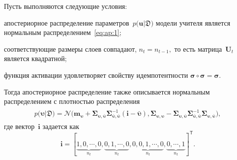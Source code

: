 \documentclass[12pt]{a&t}
\begin{document}
\begin{theorem}
\label{theorem:ap:layer}
Пусть выполняются следующие условия:
\begin{enumlist}
\item апостериорное распределение параметров~$p\bigr(\mathbf{u}|\mathfrak{D}\bigr)$ модели учителя является нормальным распределением~\eqref{eq:ap:1};
\item соответствующие размеры слоев совпадают, $n_t=n_{t-1},$ то есть матрица~$\mathbf{U}_t$ является квадратной;
\item функция активации удовлетворяет свойству идемпотентности $\bm{\sigma} \circ \bm{\sigma} = \bm{\sigma}$.
\end{enumlist}
Тогда апостериорное распределение также описывается нормальным распределением с плотностью распределения
\begin{gather}
\label{eq:ap:5}
\begin{aligned}
p\bigr(\bm{\upsilon}|\mathfrak{D}\bigr) = \mathcal{N}\bigr(\mathbf{m}_{\bm{\upsilon}}+\bm{\Sigma}_{\bm{\upsilon},\bar{\bm{\upsilon}}} \bm{\Sigma}_{\bar{\bm{\upsilon}},\bar{\bm{\upsilon}}}^{-1} \left(\mathbf{i} - \bar{\bm{\upsilon}}\right), \bm{\Sigma}_{\bm{\upsilon},\bm{\upsilon}} - \bm{\Sigma}_{\bm{\upsilon},\bar{\bm{\upsilon}}}\bm{\Sigma}_{\bar{\bm{\upsilon}},\bar{\bm{\upsilon}}}^{-1}\bm{\Sigma}_{\bm{\upsilon},\bar{\bm{\upsilon}}}\bigr),
\end{aligned}
\end{gather}
где вектор~$\mathbf{i}$ задается как
\[
\mathbf{i}=[\underbrace{1, 0, \cdots, 0}_{n_t}, \underbrace{0, 1, \cdots, 0}_{n_t}, \underbrace{0, 0, 1, \cdots, 0}_{n_t}, \underbrace{0, \cdots, 1}_{n_t}]^{\mathsf{T}}.
\]
\end{theorem}
\end{document}
